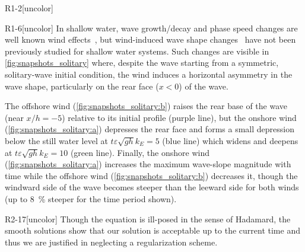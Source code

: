 \documentclass{jfm}
\renewcommand*{\epsilon}{\varepsilon}
\begin{document}
\begin{LineLabel}{R1-2}[uncolor]
\begin{LineLabel}{R1-6}[uncolor]
In shallow water, wave growth/decay and phase speed changes are well
known wind effects~\citep[\eg][]{miles1957generation,cavaleri1981wind},
but wind-induced wave shape changes~\citep{zdyrski2020wind} have not
been previously studied for shallow water systems.
Such changes are visible in \cref{fig:snapshots_solitary} where, despite
the wave starting from a symmetric, solitary-wave initial condition, the
wind induces a horizontal asymmetry in the wave shape, particularly on
the rear face ($x<0$) of the wave.
\end{LineLabel}
\end{LineLabel}
The offshore wind (\cref{fig:snapshots_solitary:b}) raises the
rear base of the wave (near $x/h = -5$) relative to its initial profile
(purple line), but the onshore wind (\cref{fig:snapshots_solitary:a})
depresses the rear face and forms a small depression below the still
water level at $t\epsilon \sqrt{gh} k_E=5$ (blue line) which widens and
deepens at $t\epsilon \sqrt{gh} k_E=10$ (green line).
Finally, the onshore wind (\cref{fig:snapshots_solitary:a})
increases the maximum wave-slope magnitude with time while the offshore
wind (\cref{fig:snapshots_solitary:b}) decreases it, though the windward
side of the wave becomes steeper than the leeward side for both winds
(up to \SI{8}{\percent} steeper for the time period shown).
\begin{LineLabel}{R2-17}[uncolor]
Though the equation is ill-posed in the sense of Hadamard, the smooth
solutions show that our solution is acceptable up to the current time
and thus we are justified in neglecting a regularization scheme.
\end{LineLabel}
\end{document}
